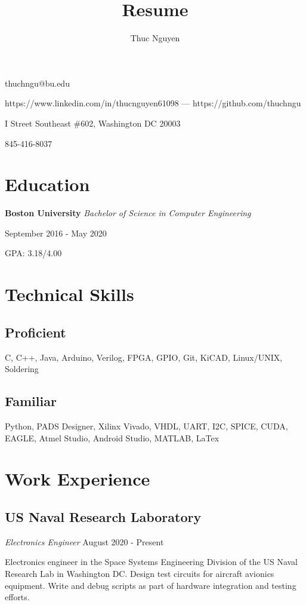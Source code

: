 \documentclass{article}
\makeatletter
\renewcommand{\maketitle}
{\begin{center}
{\huge\bfseries\theauthor}
\vspace{.5em}

thuchngu@bu.edu

https://www.linkedin.com/in/thucnguyen61098 --- https://github.com/thuchngu

\end{center}}
\makeatother
\begin{document}
\title{Resume}
\author{Thuc Nguyen}
\maketitle
\vspace{-.5em}
{ I Street Southeast \#602, Washington DC 20003

845-416-8037

}
\vspace{-1.5em}
\section{Education}
\textbf{Boston University}  \textit{Bachelor of Science in Computer Engineering}

September 2016 - May 2020

GPA: 3.18/4.00

\vspace{-.75em}
\section{Technical Skills}
\subsection{Proficient}
C, C++, Java, Arduino, Verilog, FPGA, GPIO, Git, KiCAD, Linux/UNIX, Soldering
\vspace{-.75em}
\subsection{Familiar}
Python, PADS Designer, Xilinx Vivado, VHDL, UART, I2C, SPICE, CUDA, EAGLE, Atmel Studio, Android Studio, MATLAB, LaTex

\vspace{-.75em}
\section{Work Experience}
\subsection{US Naval Research Laboratory} \textit{Electronics Engineer}
  August 2020 - Present

Electronics engineer in the Space Systems Engineering Division of the US Naval Research Lab in Washington DC. Design test circuits for aircraft avionics equipment. Write and debug scripts as part of hardware integration and testing efforts.
\vspace{-.75em}
\end{document}
